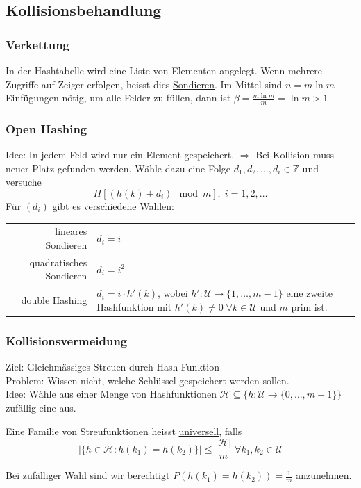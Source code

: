 \documentclass{scrartcl}
\begin{document}
\subsection{Kollisionsbehandlung}
\subsubsection{Verkettung}
In der Hashtabelle wird eine Liste von Elementen angelegt. Wenn mehrere Zugriffe auf Zeiger erfolgen, heisst dies \underline{Sondieren}. Im Mittel sind $n=m\ln m$ Einfügungen nötig, um alle Felder zu füllen, dann ist $\beta=\frac{m\ln m}{m}=\ln m > 1$
\subsubsection{Open Hashing}
Idee: In jedem Feld wird nur ein Element gespeichert. $\Rightarrow$ Bei Kollision muss neuer Platz gefunden werden. Wähle dazu eine Folge $d_1,d_2,\ldots,d_i \in \mathds{Z}$ und versuche \[ H[(h(k)+d_i) \mod m], \; i=1,2,\ldots \]
Für $(d_i)$ gibt es verschiedene Wahlen: \\
\begin{tabular}{rp{13cm}}
lineares Sondieren & $d_i=i$ \\ 
quadratisches Sondieren & $d_i=i^2$ \\ 
double Hashing & $d_i=i\cdot h'(k)$, wobei $h':\mathcal{U}\to \{1,\ldots,m-1\}$ eine zweite Hashfunktion mit $h'(k) \not= 0 \; \forall k\in\mathcal{U}$ und $m$ prim ist. \\ 
\end{tabular}

\subsubsection{Kollisionsvermeidung}
Ziel: Gleichmässiges Streuen durch Hash-Funktion\\
Problem: Wissen nicht, welche Schlüssel gespeichert werden sollen. \\
Idee: Wähle aus einer Menge von Hashfunktionen $\mathcal{H} \subseteq \{h:\mathcal{U} \to \{0,\ldots,m-1\}\}$ zufällig eine aus.
\begin{shaded}
Eine Familie von Streufunktionen heisst \underline{universell}, falls \[ \vert \{h\in\mathcal{H}: h(k_1) = h(k_2)\}\vert \leq \frac{\vert \mathcal{H}\vert}{m}\;\forall k_1,k_2\in\mathcal{U} \] 
\end{shaded}
Bei zufälliger Wahl sind wir berechtigt $P(h(k_1)=h(k_2))=\frac{1}{m}$ anzunehmen. \\
\end{document}
